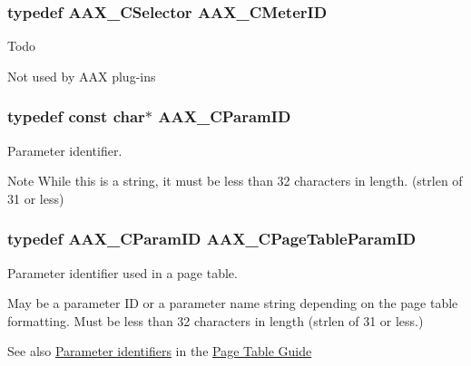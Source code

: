 \subsubsection[{A\+A\+X\+\_\+\+C\+Meter\+I\+D}]{\setlength{\rightskip}{0pt plus 5cm}typedef {\bf A\+A\+X\+\_\+\+C\+Selector} {\bf A\+A\+X\+\_\+\+C\+Meter\+I\+D}}\label{a00149_a6d976263b5f3dd5d01a89d65a3b98ded}
\begin{DoxyRefDesc}{Todo}
\item[\hyperlink{a00382__todo000007}{Todo}]Not used by A\+A\+X plug-\/ins \end{DoxyRefDesc}
\hypertarget{a00149_a1440c756fe5cb158b78193b2fc1780d1}{}
\subsubsection[{A\+A\+X\+\_\+\+C\+Param\+I\+D}]{\setlength{\rightskip}{0pt plus 5cm}typedef const char$\ast$ {\bf A\+A\+X\+\_\+\+C\+Param\+I\+D}}\label{a00149_a1440c756fe5cb158b78193b2fc1780d1}


Parameter identifier. 

\begin{DoxyNote}{Note}
While this is a string, it must be less than 32 characters in length. (strlen of 31 or less) 
\end{DoxyNote}
\hypertarget{a00149_ab4e01b971dac1b25632fd9f710dd8f77}{}
\subsubsection[{A\+A\+X\+\_\+\+C\+Page\+Table\+Param\+I\+D}]{\setlength{\rightskip}{0pt plus 5cm}typedef {\bf A\+A\+X\+\_\+\+C\+Param\+I\+D} {\bf A\+A\+X\+\_\+\+C\+Page\+Table\+Param\+I\+D}}\label{a00149_ab4e01b971dac1b25632fd9f710dd8f77}


Parameter identifier used in a page table. 

May be a parameter I\+D or a parameter name string depending on the page table formatting. Must be less than 32 characters in length (strlen of 31 or less.) \begin{DoxySeeAlso}{See also}
\hyperlink{a00363_subsection_parameter_identifiers}{Parameter identifiers} in the \hyperlink{a00363}{Page Table Guide} 
\end{DoxySeeAlso}
\hypertarget{a00149_a4b8f04e1a56624da97ace7a28d550dcc}{}
